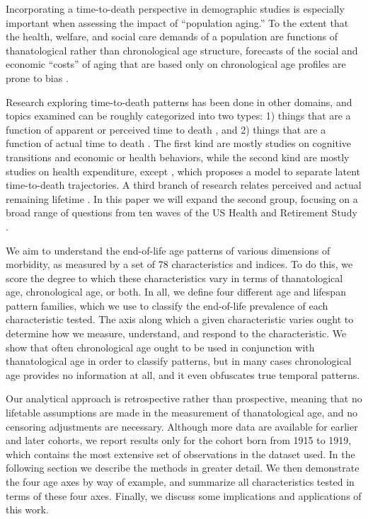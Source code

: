 \documentclass[11pt,oneside]{article} %
\begin{document}
Incorporating a time-to-death perspective in demographic studies is especially
important when assessing the impact of ``population aging.''
To the extent that the health, welfare, and social care demands of a
population are functions of thanatological rather than chronological age
structure, forecasts of the social and economic ``costs'' of aging that are
based only on chronological age profiles are prone to bias
\citep{stearns2004time}.

Research exploring time-to-death patterns has been done in other
domains, and topics examined can be roughly categorized into two types: 1)
things that are a function of apparent or perceived time to death
\citep{hamermesh1985expectations,hurd1995evaluation,carstensen2006influence,gan2004subjective,biro2010subjective,salm2010subjective,van2010living,cocco2012longevity,payne2013life,balia2013survival},
and 2) things that are a function of actual time to death
\citep{miller2001increasing,seshamani2004longitudinal,werblow2007population,
wolf2015disability,stearns2004time}.
The first kind are mostly studies on cognitive transitions and economic or
health behaviors, while the second kind are mostly studies on health
expenditure, except \citet{wolf2015disability}, which proposes a model to
separate latent time-to-death trajectories.
A third branch of research relates perceived and actual remaining lifetime
\citep{perozek2008using,delavande2011differential,post2012longevity,kutlu2013individuals}.
In this paper we will expand the second group, focusing on a broad range of
questions from ten waves of the US Health and Retirement Study \citep{HRS}.

We aim to understand the end-of-life age patterns of various dimensions of
morbidity, as measured by a set of 78 characteristics and indices. To do this,
we score the degree to which these characteristics vary in terms of thanatological
age, chronological age, or both. In all, we define four different age and
lifespan pattern families, which we use to classify the end-of-life prevalence
of each characteristic tested. The axis along which a given characteristic varies ought
to determine how we measure, understand, and respond to the characteristic. We show that often chronological age ought to be used in conjunction with
thanatological age in order to classify patterns, but in many cases
chronological age provides no information at all, and it even obfuscates true temporal
patterns.

Our analytical approach is retrospective rather than
prospective, meaning that no lifetable assumptions are made in the measurement
of thanatological age, and no censoring adjustments are necessary. Although more
data are available for earlier and later cohorts, we report results only for the
cohort born from 1915 to 1919, which contains the most extensive set of observations in
the dataset used. In the following section we describe the methods in
greater detail. We then demonstrate the four age axes by way of example,
and summarize all characteristics tested in terms of these four axes. Finally,
we discuss some implications and applications of this work.
\end{document}
